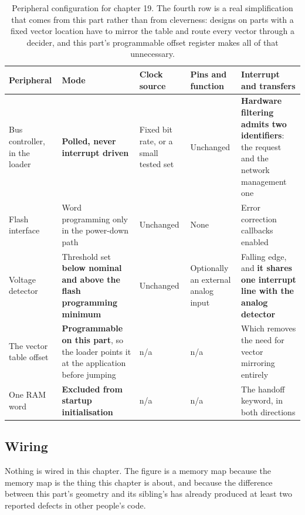 \begin{table}[H]\centering\small
\begin{tabular}{p{22mm}p{26mm}p{24mm}p{30mm}p{30mm}}
\toprule
Peripheral & Mode & Clock source & Pins and function & Interrupt and transfers \\
\midrule
Bus controller, in the loader & \textbf{Polled, never interrupt driven} & Fixed
bit rate, or a small tested set & Unchanged & \textbf{Hardware filtering admits
two identifiers}: the request and the network management one \\
Flash interface & Word programming only in the power-down path & Unchanged &
None & Error correction callbacks enabled \\
Voltage detector & Threshold set \textbf{below nominal and above the flash
programming minimum} & Unchanged & Optionally an external analog input & Falling
edge, and \textbf{it shares one interrupt line with the analog detector} \\
The vector table offset & \textbf{Programmable on this part}, so the loader
points it at the application before jumping & n/a & n/a & Which removes the need
for vector mirroring entirely \\
One RAM word & \textbf{Excluded from startup initialisation} & n/a & n/a & The
handoff keyword, in both directions \\
\bottomrule
\end{tabular}
\caption{Peripheral configuration for chapter 19. The fourth row is a real simplification that comes from this part rather than from cleverness: designs on parts with a fixed vector location have to mirror the table and route every vector through a decider, and this part's programmable offset register makes all of that unnecessary.}
\end{table}

\subsection*{Wiring}


Nothing is wired in this chapter. The figure is a memory map because the memory
map is the thing this chapter is about, and because the difference between this
part's geometry and its sibling's has already produced at least two reported
defects in other people's code.


